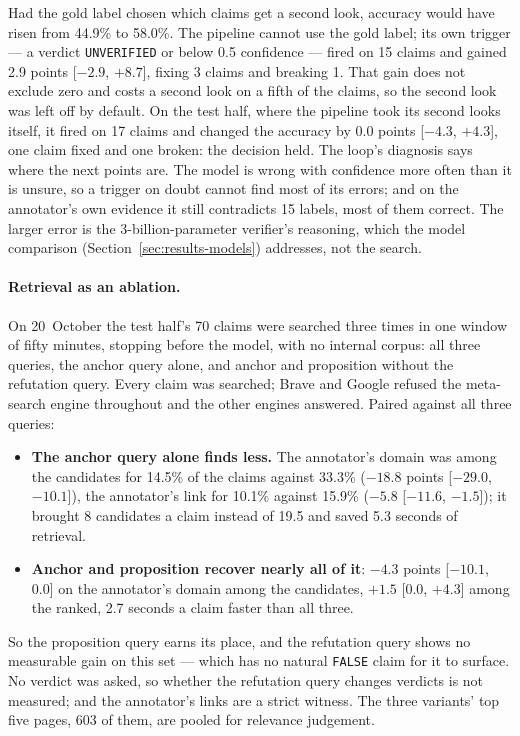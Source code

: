 Had the gold label chosen which claims get a second look, accuracy would
have risen from 44.9\% to 58.0\%. The pipeline cannot use the gold
label; its own trigger --- a verdict \texttt{UNVERIFIED} or below 0.5
confidence --- fired on 15 claims and gained 2.9 points [$-2.9$,
$+8.7$], fixing 3 claims and breaking 1. That gain does not exclude
zero and costs a second look on a fifth of the claims, so the second
look was left off by default. On the test half, where the pipeline took
its second looks itself, it fired on 17 claims and changed the accuracy
by 0.0 points [$-4.3$, $+4.3$], one claim fixed and one broken: the
decision held. The loop's diagnosis says where the next points are. The
model is wrong with confidence more often than it is unsure, so a trigger
on doubt cannot find most of its errors; and on the annotator's own
evidence it still contradicts 15 labels, most of them correct. The
larger error is the 3-billion-parameter verifier's reasoning, which the
model comparison (Section~\ref{sec:results-models}) addresses, not the
search.
\paragraph{Retrieval as an ablation.} On 20~October the test half's 70
claims were searched three times in one window of fifty minutes,
stopping before the model, with no internal corpus: all three queries,
the anchor query alone, and anchor and proposition without the
refutation query. Every claim was searched; Brave and Google refused
the meta-search engine throughout and the other engines answered.
Paired against all three queries:

\begin{itemize}
    \item \textbf{The anchor query alone finds less.} The annotator's
    domain was among the candidates for 14.5\% of the claims against
    33.3\% ($-18.8$ points [$-29.0$, $-10.1$]), the annotator's link for
    10.1\% against 15.9\% ($-5.8$ [$-11.6$, $-1.5$]); it brought 8
    candidates a claim instead of 19.5 and saved 5.3 seconds of retrieval.
    \item \textbf{Anchor and proposition recover nearly all of it}:
    $-4.3$ points [$-10.1$, 0.0] on the annotator's domain among the
    candidates, $+1.5$ [0.0, $+4.3$] among the ranked, 2.7 seconds a claim
    faster than all three.
\end{itemize}

So the proposition query earns its place, and the refutation query
shows no measurable gain on this set --- which has no natural
\texttt{FALSE} claim for it to surface. No verdict was asked, so whether
the refutation query changes verdicts is not measured; and the
annotator's links are a strict witness. The three variants' top five
pages, 603 of them, are pooled for relevance judgement.
